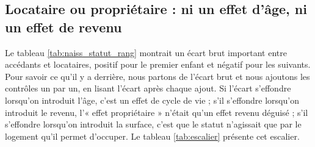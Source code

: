 \documentclass[12pt,a4paper]{article}
\begin{document}
\subsection{Locataire ou propriétaire : ni un effet d'âge, ni un effet de revenu}\label{sec:statut}

Le tableau \ref{tab:naiss_statut_rang} montrait un écart brut important entre accédants et locataires, positif pour le premier enfant et négatif pour les suivants. Pour savoir ce qu'il y a derrière, nous partons de l'écart brut et nous ajoutons les contrôles un par un, en lisant l'écart après chaque ajout. Si l'écart s'effondre lorsqu'on introduit l'âge, c'est un effet de cycle de vie ; s'il s'effondre lorsqu'on introduit le revenu, l'« effet propriétaire » n'était qu'un effet revenu déguisé ; s'il s'effondre lorsqu'on introduit la surface, c'est que le statut n'agissait que par le logement qu'il permet d'occuper. Le tableau \ref{tab:escalier} présente cet escalier. \\

\bigskip
\end{document}
